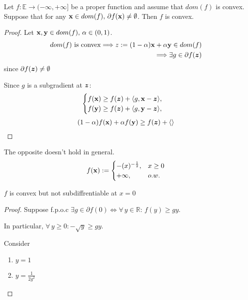 \documentclass[11pt]{article}
\begin{document}
\begin{lemma}
    Let $f: \mathbb{E} \to (-\infty,+\infty]$ be a proper function and assume that $dom(f)$ is convex.
    Suppose that for any ${\mathbf{x}} \in dom(f), \, \partial f({\mathbf{x}}) \neq \emptyset$. Then $f$ is convex.
\end{lemma}
\begin{proof}
    Let ${\mathbf{x}}, {\mathbf{y}} \in dom(f), \, \alpha \in (0,1)$.
    \begin{align*}
        dom(f) \text{ is convex} \Longrightarrow z := (1-\alpha){\mathbf{x}} + \alpha {\mathbf{y}} \in dom(f)\\
        \Longrightarrow \exists g \in \partial f({\bm{z}})
    \end{align*}
    since $\partial f({\bm{z}}) \neq \emptyset$

    Since $g$ is a subgradient at ${\bm{z}}$:
    \begin{equation}
        \begin{cases} 
        f({\mathbf{x}}) \ge f({\bm{z}}) + \langle g, {\mathbf{x}} -{\bm{z}} \rangle, &  \\ 
        f({\mathbf{y}}) \ge f({\bm{z}}) + \langle g, {\mathbf{y}} -{\bm{z}} \rangle, &   
        \end{cases}
    \end{equation}
    \begin{align*}
        (1-\alpha)f({\mathbf{x}}) + \alpha f({\mathbf{y}}) \ge f({\bm{z}}) + \langle  \rangle
    \end{align*}
\end{proof}

\begin{remark}
    The opposite doesn't hold in general.
    \begin{equation}
        f({\mathbf{x}}) :=
        \begin{cases} 
        -(x)^{-\frac{1}{2}}, & x \ge 0  \\ 
        +\infty, &   o.w.
        \end{cases}
    \end{equation}
    \begin{claim}
        $f$ is convex but not subdiffrentiable at $x = 0$
    \end{claim}
    \begin{proof}
        Suppose f.p.o.c $\exists g \in \partial f(0) \iff \forall \, y \in \mathbb{R}:
        \, f(y) \ge gy$.

        In particular, $\forall \, y \ge 0: -\sqrt{y} \ge gy$.

        Consider 
        \begin{enumerate}
            \item $y = 1$
            \item $y = \frac{1}{2g^{2}}$
        \end{enumerate}
    \end{proof}
\end{remark}
\end{document}
